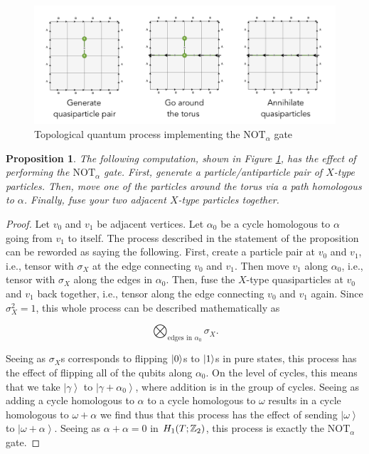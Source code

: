 \documentclass{article}
\newtheorem{proposition}{Proposition}[section]
\theoremstyle{definition}
\numberwithin{figure}{section}
\begin{document}
\begin{figure}
\begin{center}
\includegraphics[scale=0.45]{not-alpha-gate}
\caption{Topological quantum process implementing the $\text{NOT}_{\alpha}$ gate}
\label{fig:not-alpha-gate}
\end{center}
\end{figure}

\begin{proposition} The following computation, shown in Figure \ref{fig:not-alpha-gate}, has the effect of performing the $\text{NOT}_{\alpha}$ gate. First, generate a particle/antiparticle pair of $X$-type particles. Then, move one of the particles around the torus via a path homologous to $\alpha$. Finally, fuse your two adjacent $X$-type particles together.
\end{proposition}
\begin{proof} Let $v_0$ and $v_1$ be adjacent vertices. Let $\alpha_0$ be a cycle homologous to $\alpha$ going from $v_1$ to itself. The process described in the statement of the proposition can be reworded as saying the following. First, create a particle pair at $v_0$ and $v_1$, i.e., tensor with $\sigma_X$ at the edge connecting $v_0$ and $v_1$. Then move $v_1$ along $\alpha_0$, i.e., tensor with $\sigma_X$ along the edges in $\alpha_0$. Then, fuse the $X$-type quasiparticles at $v_0$ and $v_1$ back together, i.e., tensor along the edge connecting $v_0$ and $v_1$ again. Since $\sigma_X^2=1$, this whole process can be described mathematically as

$$\bigotimes_{\text{edges in }\alpha_0}\sigma_X.$$

Seeing as $\sigma_X$s corresponds to flipping $\left|0\right>$s to $\left|1\right>$s in pure states, this process has the effect of flipping all of the qubits along $\alpha_0$. On the level of cycles, this means that we take $\left|\gamma\right>$ to $\left|\gamma+\alpha_0\right>$, where addition is in the group of cycles. Seeing as adding a cycle homologous to $\alpha$ to a cycle homologous to $\omega$ results in a cycle homologous to $\omega+\alpha$ we find thus that this process has the effect of sending $\left|\omega\right>$ to $\left|\omega+\alpha\right>$. Seeing as $\alpha+\alpha=0$ in $H_1(T;\mathbb{Z}_2)$, this process is exactly the $\text{NOT}_{\alpha}$ gate.
\end{proof}
\end{document}
